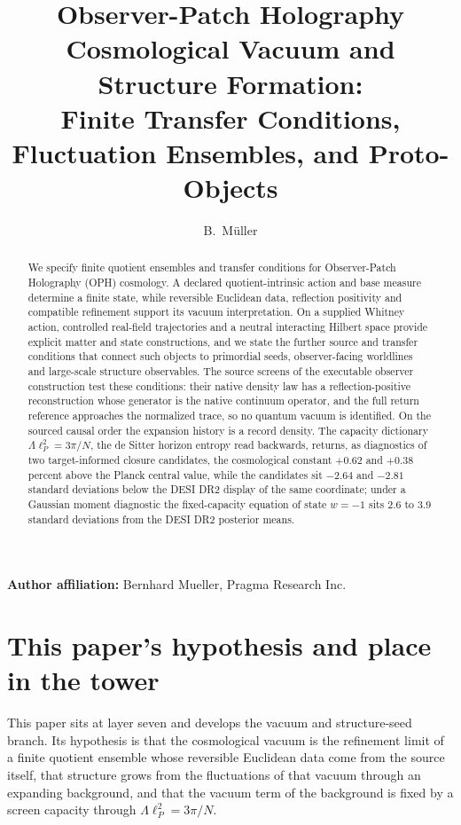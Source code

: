 \documentclass[11pt]{article}
\title{Observer-Patch Holography Cosmological Vacuum and Structure Formation:\\
Finite Transfer Conditions, Fluctuation Ensembles, and Proto-Objects}
\author{B.\ M\"uller}
\date{\OPHPaperReleaseDate}
\theoremstyle{remark}
\theoremstyle{plain}
\begin{document}
\maketitle
\OPHPaperReleaseBanner

\begin{center}
\small\textbf{Author affiliation:} Bernhard Mueller, Pragma Research Inc.
\end{center}

\begin{abstract}
We specify finite quotient ensembles and transfer conditions for
Observer-Patch Holography (OPH) cosmology. A declared quotient-intrinsic action
and base measure determine a finite state, while reversible Euclidean data,
reflection positivity and compatible refinement support its vacuum
interpretation. On a supplied Whitney action, controlled real-field
trajectories and a neutral interacting Hilbert space provide explicit matter
and state constructions, and we state the further source and transfer
conditions that connect such objects to primordial seeds, observer-facing
worldlines and large-scale structure observables. The source screens of the
executable observer construction test these conditions: their native
density law has a reflection-positive reconstruction whose generator is the
native continuum operator, and the full return reference approaches the
normalized trace, so no quantum vacuum is identified. On the sourced causal
order the expansion history is a record density. The capacity dictionary
\(\Lambda\ell_P^2=3\pi/N\), the de Sitter horizon entropy read backwards,
returns, as diagnostics of two target-informed
closure candidates, the cosmological constant \(+0.62\) and \(+0.38\)
percent above the Planck central value, while the candidates sit \(-2.64\)
and \(-2.81\) standard deviations below the DESI DR2 display of the same
coordinate; under a Gaussian moment diagnostic the fixed-capacity equation
of state \(w=-1\) sits \(2.6\) to \(3.9\) standard deviations from the
DESI DR2 posterior means.
\end{abstract}



\section*{This paper's hypothesis and place in the tower}

This paper sits at layer seven and develops the vacuum and structure-seed
branch. Its hypothesis is that the cosmological vacuum is the refinement
limit of a finite quotient ensemble whose reversible Euclidean data come
from the source itself, that structure grows from the fluctuations of that
vacuum through an expanding background, and that the vacuum term of the
background is fixed by a screen capacity through \(\Lambda\ell_P^2=3\pi/N\).
\end{document}
